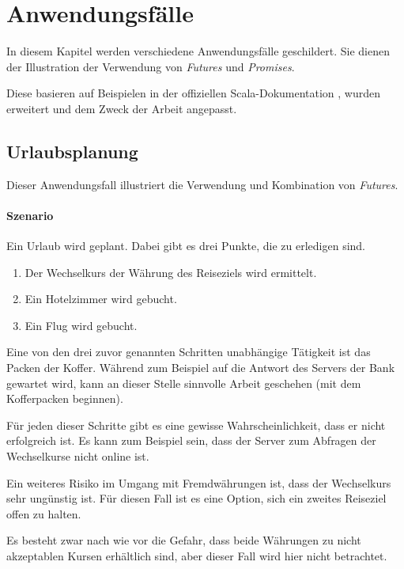 \section{Anwendungsfälle}

In diesem Kapitel werden verschiedene Anwendungsfälle geschildert.
Sie dienen der Illustration der Verwendung von \emph{Futures} und
\emph{Promises}.

Diese basieren auf Beispielen in der offiziellen Scala-Dokumentation
\cite{scalaDokuFP}, wurden erweitert und dem Zweck der Arbeit
angepasst.

\subsection{Urlaubsplanung}

Dieser Anwendungsfall illustriert die Verwendung und Kombination
von \emph{Futures}.

\paragraph{Szenario}

Ein Urlaub wird geplant. Dabei gibt es drei Punkte, die zu erledigen sind.

\begin{enumerate}
\item Der Wechselkurs der Währung des Reiseziels wird ermittelt.
\item Ein Hotelzimmer wird gebucht.
\item Ein Flug wird gebucht.
\end{enumerate}

Eine von den drei zuvor genannten Schritten unabhängige Tätigkeit ist
das Packen der Koffer. Während zum Beispiel auf die Antwort des Servers 
der Bank gewartet wird, kann an dieser Stelle sinnvolle Arbeit geschehen 
(mit dem Kofferpacken beginnen).

Für jeden dieser Schritte gibt es eine gewisse Wahrscheinlichkeit, 
dass er nicht erfolgreich ist. Es kann zum Beispiel sein, dass der 
Server zum Abfragen der Wechselkurse nicht online ist.

Ein weiteres Risiko im Umgang mit Fremdwährungen ist, dass der 
Wechselkurs sehr ungünstig ist. Für diesen Fall ist es eine Option,
sich ein zweites Reiseziel offen zu halten.

Es besteht zwar nach wie vor die Gefahr, dass beide Währungen zu nicht
akzeptablen Kursen erhältlich sind, aber dieser Fall wird hier nicht 
betrachtet.

